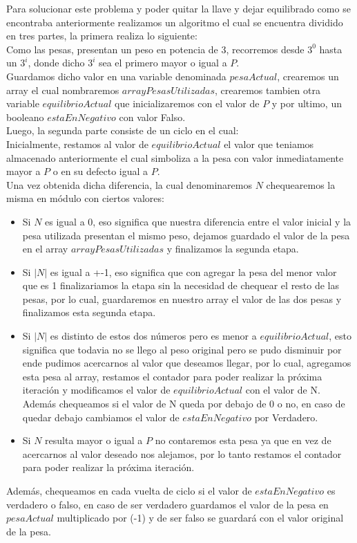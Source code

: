 
Para solucionar este problema y poder quitar la llave y dejar equilibrado como se encontraba anteriormente realizamos un algoritmo el cual se encuentra dividido en tres partes, la primera realiza lo siguiente:\\

Como las pesas, presentan un peso en potencia de 3, recorremos desde $3^0$ hasta un $3^i$, donde dicho $3^i$ sea el primero mayor o igual a $P$.\\
Guardamos dicho valor en una variable denominada $pesaActual$, crearemos un array el cual nombraremos $arrayPesasUtilizadas$, crearemos tambien otra variable $equilibrioActual$ que inicializaremos con el valor de $P$ y por ultimo, un booleano $estaEnNegativo$ con valor Falso.\\


Luego, la segunda parte consiste de un ciclo en el cual:\\

	Inicialmente, restamos al valor de $equilibrioActual$ el valor que teniamos almacenado anteriormente el cual simboliza a la pesa con valor inmediatamente mayor a $P$ o en su defecto igual a $P$.\\
	Una vez obtenida dicha diferencia, la cual denominaremos $N$ chequearemos la misma en m\'odulo con ciertos valores:
	\begin{itemize}
	\item Si $N$ es igual a 0, eso significa que nuestra diferencia entre el valor inicial y la pesa utilizada presentan el mismo peso, dejamos guardado el valor de la pesa en el array $arrayPesasUtilizadas$ y finalizamos la segunda etapa.
	\item Si $|N|$ es igual a +-1, eso significa que con agregar la pesa del menor valor que es 1 finalizariamos la etapa sin la necesidad de chequear el resto de las pesas, por lo cual, guardaremos en nuestro array el valor de las dos pesas y finalizamos esta segunda etapa.
	\item Si $|N|$ es distinto de estos dos n\'umeros pero es menor a $equilibrioActual$, esto significa que todavia no se llego al peso original pero se pudo disminuir por ende pudimos acercarnos al valor que deseamos llegar, por lo cual, agregamos esta pesa al array, restamos el contador para poder realizar la pr\'oxima iteraci\'on y modificamos el valor de $equilibrioActual$ con el valor de N. Adem\'as chequeamos si el valor de N queda por debajo de 0 o no, en caso de quedar debajo cambiamos el valor de $estaEnNegativo$ por Verdadero.
	\item Si $N$ resulta mayor o igual a $P$ no contaremos esta pesa ya que en vez de acercarnos al valor deseado nos alejamos, por lo tanto restamos el contador para poder realizar la pr\'oxima iteraci\'on.
	\end{itemize}
	Adem\'as, chequeamos en cada vuelta de ciclo si el valor de $estaEnNegativo$ es verdadero o falso, en caso de ser verdadero guardamos el valor de la pesa en $pesaActual$ multiplicado por (-1) y de ser falso se guardar\'a con el valor original de la pesa.

